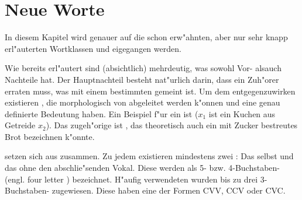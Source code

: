 \chapter{Neue Worte}
In diesem Kapitel wird genauer auf die schon erw"ahnten, aber nur sehr knapp erl"auterten Wortklassen  und  eigegangen
werden.

Wie bereits erl"autert sind  (absichtlich) mehrdeutig, was sowohl Vor- alsauch Nachteile hat. Der Hauptnachteil besteht nat"urlich
darin, dass ein Zuh"orer erraten muss, was mit einem bestimmten  gemeint ist. Um dem entgegenzuwirken existieren , die
morphologisch von  abgeleitet werden k"onnen und eine genau definierte Bedeutung haben. Ein Beispiel f"ur ein  ist
 ($x_1$ ist ein Kuchen aus Getreide $x_2$). Das zugeh"orige  ist , das theoretisch auch ein mit 
Zucker bestreutes Brot bezeichnen k"onnte.

 setzen sich aus  zusammen. Zu jedem  existieren mindestens zwei : Das  selbst und das  ohne
den abschlie"senden Vokal. Diese  werden als 5- bzw. 4-Buchstaben- (engl. four letter ) bezeichnet. 
H"aufig verwendeten  wurden bis zu drei 3-Buchstaben- zugewiesen. Diese  haben eine der Formen CVV, CCV oder
CVC.
